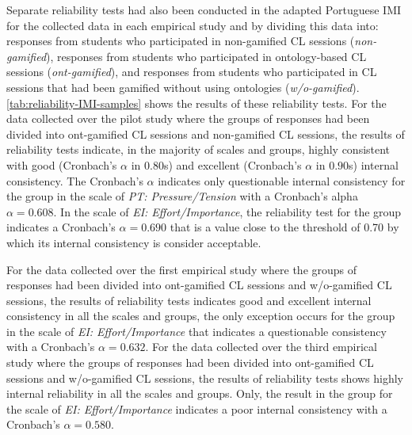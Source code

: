 Separate reliability tests had also been conducted in the adapted Portuguese IMI for the collected data in each empirical study and by dividing this data into: responses from students who participated in non-gamified CL sessions (\emph{non-gamified}), responses from students who participated in ontology-based CL sessions (\emph{ont-gamified}), and responses from students who participated in CL sessions that had been gamified without using ontologies (\emph{w/o-gamified}). \autoref{tab:reliability-IMI-samples} shows the results of these reliability tests. For the data collected over the pilot study where the groups of responses had been divided into ont-gamified CL sessions and non-gamified CL sessions, the results of reliability tests indicate, in the majority of scales and groups, highly consistent with good (Cronbach's $\alpha$ in $0.80$s) and excellent (Cronbach's $\alpha$ in $0.90$s) internal consistency. The Cronbach's $\alpha$ indicates only questionable internal consistency for the  group in the scale of \emph{PT: Pressure/Tension} with a Cronbach's alpha $\alpha = 0.608$. In the scale of \emph{EI: Effort/Importance}, the reliability test for the  group indicates a Cronbach's $\alpha = 0.690$ that is a value close to the threshold of 0.70 by which its internal consistency is consider acceptable.

For the data collected over the first empirical study where the groups of responses had been divided into ont-gamified CL sessions and w/o-gamified CL sessions, the results of reliability tests indicates good and excellent internal consistency in all the scales and groups, the only exception occurs for the  group in the scale of \emph{EI: Effort/Importance} that indicates a questionable consistency with a Cronbach's $\alpha = 0.632$. For the data collected over the third empirical study where the groups of responses had been divided into ont-gamified CL sessions and w/o-gamified CL sessions, the results of reliability tests shows highly internal reliability in all the scales and groups. Only, the result in the group  for the scale of \emph{EI: Effort/Importance} indicates a poor internal consistency with a Cronbach's $\alpha = 0.580$.

